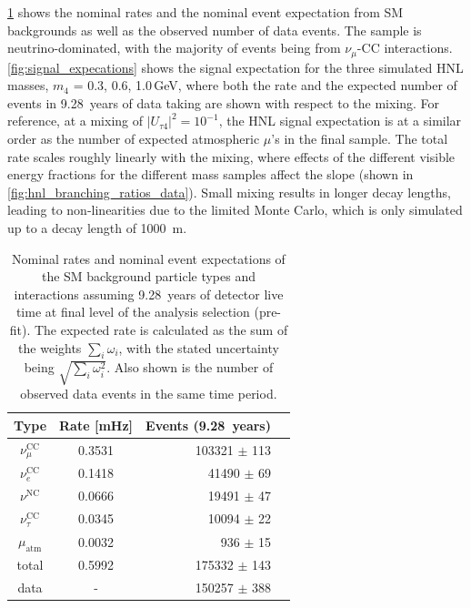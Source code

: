 \documentclass[
    aps,
    prd,
    reprint,
    amsmath,
    amssymb,
    nofootinbib,
    superscriptaddress,
    floatfix
]{revtex4-2}
\def\nomathut4{|U_{\tau4}|^2}
\renewcommand{\rm}{\mathrm}
\newcommand{\rm}{\mathrm}
\begin{document}
\cref{tab:background_final_level_expectation} shows the nominal rates and the nominal event expectation from SM backgrounds as well as the observed number of data events. The sample is neutrino-dominated, with the majority of events being from $\nu_\mu$-CC interactions. \cref{fig:signal_expecations} shows the signal expectation for the three simulated HNL masses, $m_4$ = {0.3, 0.6, 1.0}\,GeV, where both the rate and the expected number of events in \SI{9.28}{years} of data taking are shown with respect to the mixing. For reference, at a mixing of $\nomathut4=10^{-1}$, the HNL signal expectation is at a similar order as the number of expected atmospheric $\mu$'s in the final sample. The total rate scales roughly linearly with the mixing, where effects of the different visible energy fractions for the different mass samples affect the slope (shown in \cref{fig:hnl_branching_ratios_data}). Small mixing results in longer decay lengths, leading to non-linearities due to the limited Monte Carlo, which is only simulated up to a decay length of \SI{1000}{\meter}.

\begin{table}[h]
    \begin{tabular}{ ccrr }
    \hline\hline
    \textbf{Type} & \textbf{Rate [\si{\milli\hertz}]} & \textbf{Events (\SI{9.28}{years})} \\
    \hline\hline
    $\nu_\mu^\rm{CC}$   & 0.3531 & 103321 $\pm$ 113 \\
    $\nu_e^\rm{CC}$     & 0.1418 & 41490 $\pm$ 69 \\
    $\nu^\rm{NC}$       & 0.0666 & 19491 $\pm$ 47 \\
    $\nu_\tau^\rm{CC}$  & 0.0345 & 10094 $\pm$ 22 \\
    $\mu_\rm{atm}$      & 0.0032 & 936 $\pm$ 15 \\
    \hline
    total               & 0.5992 & 175332 $\pm$ 143 \\
    \hline
    data                & -      & 150257 $\pm$ 388 \\
    \hline
    \end{tabular}
\caption{Nominal rates and nominal event expectations of the SM background particle types and interactions assuming \SI{9.28}{years} of detector live time at final level of the analysis selection (pre-fit). The expected rate is calculated as the sum of the weights $\sum_i\omega_i$, with the stated uncertainty being $\sqrt{\sum_i\omega_i^2}$. Also shown is the number of observed data events in the same time period.}
\label{tab:background_final_level_expectation}
\end{table}
\end{document}
